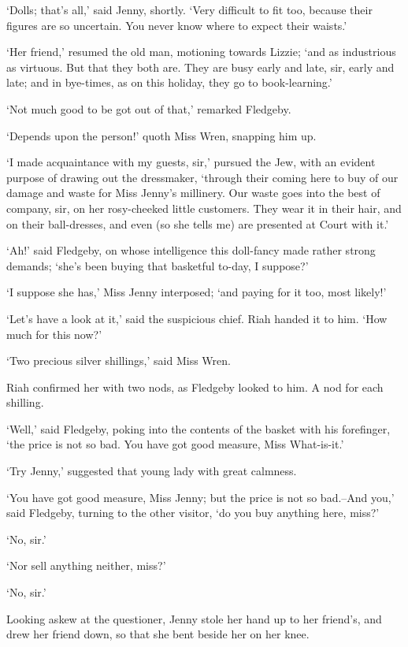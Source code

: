 ‘Dolls; that’s all,’ said Jenny, shortly. ‘Very difficult to fit too,
because their figures are so uncertain. You never know where to expect
their waists.’

‘Her friend,’ resumed the old man, motioning towards Lizzie; ‘and as
industrious as virtuous. But that they both are. They are busy early and
late, sir, early and late; and in bye-times, as on this holiday, they go
to book-learning.’

‘Not much good to be got out of that,’ remarked Fledgeby.

‘Depends upon the person!’ quoth Miss Wren, snapping him up.

‘I made acquaintance with my guests, sir,’ pursued the Jew, with an
evident purpose of drawing out the dressmaker, ‘through their coming
here to buy of our damage and waste for Miss Jenny’s millinery. Our
waste goes into the best of company, sir, on her rosy-cheeked little
customers. They wear it in their hair, and on their ball-dresses, and
even (so she tells me) are presented at Court with it.’

‘Ah!’ said Fledgeby, on whose intelligence this doll-fancy made rather
strong demands; ‘she’s been buying that basketful to-day, I suppose?’

‘I suppose she has,’ Miss Jenny interposed; ‘and paying for it too, most
likely!’

‘Let’s have a look at it,’ said the suspicious chief. Riah handed it to
him. ‘How much for this now?’

‘Two precious silver shillings,’ said Miss Wren.

Riah confirmed her with two nods, as Fledgeby looked to him. A nod for
each shilling.

‘Well,’ said Fledgeby, poking into the contents of the basket with his
forefinger, ‘the price is not so bad. You have got good measure, Miss
What-is-it.’

‘Try Jenny,’ suggested that young lady with great calmness.

‘You have got good measure, Miss Jenny; but the price is not so
bad.--And you,’ said Fledgeby, turning to the other visitor, ‘do you buy
anything here, miss?’

‘No, sir.’

‘Nor sell anything neither, miss?’

‘No, sir.’

Looking askew at the questioner, Jenny stole her hand up to her
friend’s, and drew her friend down, so that she bent beside her on her
knee.

